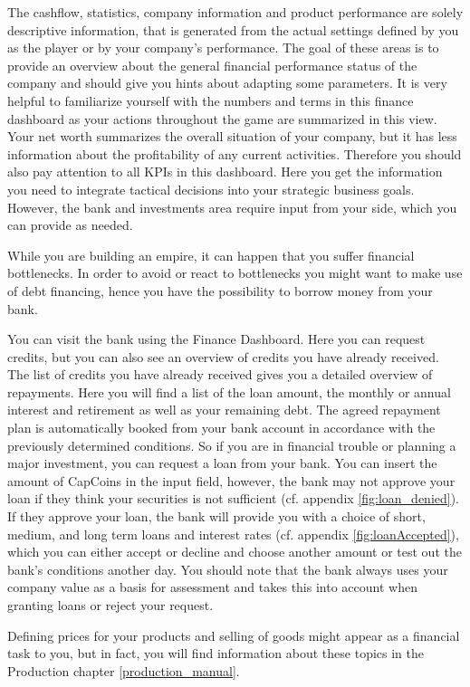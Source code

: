  The cashflow, statistics, company information and product performance are solely descriptive information, that is generated from the actual settings defined by you as the player or by your company’s performance. The goal of these areas is to provide an overview about the general financial performance status of the company and should give you hints about adapting some parameters. 
It is very helpful to familiarize yourself with the numbers and terms in this finance dashboard as your actions throughout the game are summarized in this view. Your net worth summarizes the overall situation of your company, but it has less information about the profitability of any current activities. Therefore you should also pay attention to all KPIs in this dashboard. Here you get the information you need to integrate tactical decisions into your strategic business goals. 
 However, the bank and investments area require input from your side, which you can provide as needed. 

While you are building an empire, it can happen that you suffer financial bottlenecks. In order to avoid or react to bottlenecks you might want to make use of debt financing, hence you have the possibility to borrow money from your bank. 

You can visit the bank using the Finance Dashboard. Here you can request credits, but you can also see an overview of credits you have already received.
The list of credits you have already received gives you a detailed overview of repayments. Here you will find a list of the loan amount, the monthly or annual interest and retirement as well as your remaining debt. The agreed repayment plan is automatically booked from your bank account in accordance with the previously determined conditions.
So if you are in financial trouble or planning a major investment, you can request a loan from your bank. You can insert the amount of CapCoins in the input field, however, the bank may not approve your loan if they think your securities is not sufficient (cf. appendix \ref{fig:loan_denied}). If they approve your loan, the bank will provide you with a choice of short, medium, and long term loans and interest rates (cf. appendix  \ref{fig:loanAccepted}), which you can either accept or decline and choose another amount or test out the bank's conditions another day. You should note that the bank always uses your company value as a basis for assessment and takes this into account when granting loans or reject your request. 

Defining prices for your products and selling of goods might appear as a financial task to you, but in fact, you will find information about these topics in the Production chapter \ref{production_manual}.